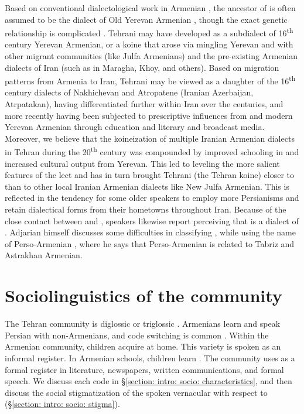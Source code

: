Based on conventional dialectological work in Armenian \citep{Adjarian-1911-DialectologyBook}, the ancestor of {\seaSEA} is often assumed to be the dialect of Old Yerevan Armenian \citep{Dolatian-prep-Adjarian}, though the exact genetic relationship is complicated \citep{SayeedVaux-2017-EvolutionArmenian}. Tehrani   {\iaIA} may have developed as a subdialect of 16\textsuperscript{th} century Yerevan Armenian, or a koine that arose via mingling Yerevan and {\seaAbbre} with other migrant communities (like Julfa Armenians) and the pre-existing Armenian dialects of Iran (such as in Maragha, Khoy, and others). Based on migration patterns from Armenia to Iran, Tehrani {\iaAbbre}   may be viewed as a daughter of the 16\textsuperscript{th} century dialects of Nakhichevan and Atropatene (Iranian Azerbaijan, Atrpatakan), having differentiated further within Iran over the centuries, and more recently having been subjected to prescriptive influences from {\seaAbbre} and modern Yerevan Armenian through education and literary and broadcast media. Moreover, we believe that the koineization of multiple Iranian Armenian dialects in Tehran during the 20\textsuperscript{th} century was compounded by improved schooling in {\seaAbbre} and increased cultural output from Yerevan. This led to leveling the more salient features of the lect and has in turn brought Tehrani {\iaIA} (the Tehran koine) closer to {\seaAbbre} than to other local Iranian Armenian dialects like New Julfa Armenian. This is reflected in the tendency for some older speakers to employ more Persianisms and retain dialectical forms from their hometowns throughout Iran. Because of the close contact between {\iaIA} and {\seaAbbre}, {\iaAbbre} speakers likewise report perceiving that {\iaAbbre} is a dialect of {\seaAbbre}. Adjarian himself discusses some difficulties in classifying {\iaAbbre}, while using the name of Perso-Armenian \citep[\S1]{Adjarian-1940-NewJulfaDialect}, where he says that Perso-Armenian is related to Tabriz and Astrakhan Armenian.



\section{Sociolinguistics of the {\iaIA} community }\label{section: intro: socio}

The Tehran community is diglossic or triglossic \citep{Nercissians-1988-lifeCultureArmeniansIran,Nercissians-2012-lifeCultureArmeniansIran}. Armenians learn and speak Persian with non-Armenians, and code switching is common \citep{GhiasianRezayi-2014-PersianArmenianCodeswitching,GhiasianRazaei-2014-StudyPersianMultifunctionalDiscourseMarkerArmenianPersianBilinguals}. Within the Armenian community, children acquire {\iaIA} at home. This variety is spoken as an informal register. In Armenian schools, children learn {\seaSEA}. The community uses {\seaSEA} as a formal register  in literature, newspapers, written communications, and formal speech. We discuss each code in \S\ref{section: intro: socio: characteristics}, and then discuss the social stigmatization of the spoken vernacular with respect to    {\seaSEA} (\S\ref{section: intro: socio: stigma}). 

